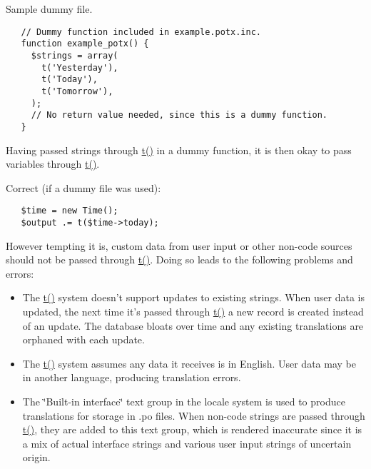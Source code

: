 Sample dummy file. 

\begin{Code}\begin{verbatim}   // Dummy function included in example.potx.inc.
   function example_potx() {
     $strings = array(
       t('Yesterday'),
       t('Today'),
       t('Tomorrow'),
     );
     // No return value needed, since this is a dummy function.
   }
\end{verbatim}
\end{Code}



Having passed strings through \hyperlink{common_8inc_41d20f0c822bf1f3c26a97981c762665}{t()} in a dummy function, it is then okay to pass variables through \hyperlink{common_8inc_41d20f0c822bf1f3c26a97981c762665}{t()}.

Correct (if a dummy file was used): 

\begin{Code}\begin{verbatim}   $time = new Time();
   $output .= t($time->today);
\end{verbatim}
\end{Code}



However tempting it is, custom data from user input or other non-code sources should not be passed through \hyperlink{common_8inc_41d20f0c822bf1f3c26a97981c762665}{t()}. Doing so leads to the following problems and errors:\begin{itemize}
\item The \hyperlink{common_8inc_41d20f0c822bf1f3c26a97981c762665}{t()} system doesn't support updates to existing strings. When user data is updated, the next time it's passed through \hyperlink{common_8inc_41d20f0c822bf1f3c26a97981c762665}{t()} a new record is created instead of an update. The database bloats over time and any existing translations are orphaned with each update.\item The \hyperlink{common_8inc_41d20f0c822bf1f3c26a97981c762665}{t()} system assumes any data it receives is in English. User data may be in another language, producing translation errors.\item The \char`\"{}Built-in interface\char`\"{} text group in the locale system is used to produce translations for storage in .po files. When non-code strings are passed through \hyperlink{common_8inc_41d20f0c822bf1f3c26a97981c762665}{t()}, they are added to this text group, which is rendered inaccurate since it is a mix of actual interface strings and various user input strings of uncertain origin.\end{itemize}


